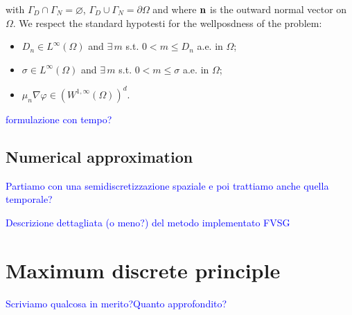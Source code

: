 with $\Gamma_D\cap\Gamma_N=\varnothing$, $\Gamma_D\cup\Gamma_N=\partial \Omega$ and where $\mathbf{n}$ is the outward normal vector on $\Omega$.
We respect the standard hypotesti for the wellposdness of the problem:
\begin{itemize}
\item $D_n \in L^{\infty}(\Omega)$ and $\exists \, m$ s.t. $0<m\leq D_n$ a.e. in $\Omega$;
\item $\sigma \in L^{\infty}(\Omega)$ and $\exists \, m$ s.t. $0<m\leq \sigma$ a.e. in $\Omega$;
\item $\mu_n \nabla \varphi \in (W^{1,\infty}(\Omega))^d$.
\end{itemize}

\textcolor{blue}{formulazione con tempo?}


\subsection{Numerical approximation}

\textcolor{blue}{Partiamo con una semidiscretizzazione spaziale e poi trattiamo anche quella temporale?}

\textcolor{blue}{Descrizione dettagliata (o meno?) del metodo implementato FVSG}

\section{Maximum discrete principle}
\textcolor{blue}{Scriviamo qualcosa in merito?Quanto approfondito?}




